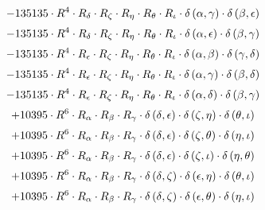 \begin{subequations}
\begin{gather}
 \\[0.2em] \notag 		 - 135135 \cdot R^{4} \cdot R_{\delta{}} \cdot R_{\zeta{}} \cdot R_{\eta{}} \cdot R_{\theta{}} \cdot R_{\iota{}} \cdot \delta{}\left(\alpha{}, \gamma{}\right) \cdot \delta{}\left(\beta{}, \epsilon{}\right) 
 \\[0.2em] \notag 		 - 135135 \cdot R^{4} \cdot R_{\delta{}} \cdot R_{\zeta{}} \cdot R_{\eta{}} \cdot R_{\theta{}} \cdot R_{\iota{}} \cdot \delta{}\left(\alpha{}, \epsilon{}\right) \cdot \delta{}\left(\beta{}, \gamma{}\right) 
 \\[0.2em] \notag 		 - 135135 \cdot R^{4} \cdot R_{\epsilon{}} \cdot R_{\zeta{}} \cdot R_{\eta{}} \cdot R_{\theta{}} \cdot R_{\iota{}} \cdot \delta{}\left(\alpha{}, \beta{}\right) \cdot \delta{}\left(\gamma{}, \delta{}\right) 
 \\[0.2em] \notag 		 - 135135 \cdot R^{4} \cdot R_{\epsilon{}} \cdot R_{\zeta{}} \cdot R_{\eta{}} \cdot R_{\theta{}} \cdot R_{\iota{}} \cdot \delta{}\left(\alpha{}, \gamma{}\right) \cdot \delta{}\left(\beta{}, \delta{}\right) 
 \\[0.2em] \notag 		 - 135135 \cdot R^{4} \cdot R_{\epsilon{}} \cdot R_{\zeta{}} \cdot R_{\eta{}} \cdot R_{\theta{}} \cdot R_{\iota{}} \cdot \delta{}\left(\alpha{}, \delta{}\right) \cdot \delta{}\left(\beta{}, \gamma{}\right) 
 \\[0.2em] \notag 		 + 10395 \cdot R^{6} \cdot R_{\alpha{}} \cdot R_{\beta{}} \cdot R_{\gamma{}} \cdot \delta{}\left(\delta{}, \epsilon{}\right) \cdot \delta{}\left(\zeta{}, \eta{}\right) \cdot \delta{}\left(\theta{}, \iota{}\right) 
 \\[0.2em] \notag 		 + 10395 \cdot R^{6} \cdot R_{\alpha{}} \cdot R_{\beta{}} \cdot R_{\gamma{}} \cdot \delta{}\left(\delta{}, \epsilon{}\right) \cdot \delta{}\left(\zeta{}, \theta{}\right) \cdot \delta{}\left(\eta{}, \iota{}\right) 
 \\[0.2em] \notag 		 + 10395 \cdot R^{6} \cdot R_{\alpha{}} \cdot R_{\beta{}} \cdot R_{\gamma{}} \cdot \delta{}\left(\delta{}, \epsilon{}\right) \cdot \delta{}\left(\zeta{}, \iota{}\right) \cdot \delta{}\left(\eta{}, \theta{}\right) 
 \\[0.2em] \notag 		 + 10395 \cdot R^{6} \cdot R_{\alpha{}} \cdot R_{\beta{}} \cdot R_{\gamma{}} \cdot \delta{}\left(\delta{}, \zeta{}\right) \cdot \delta{}\left(\epsilon{}, \eta{}\right) \cdot \delta{}\left(\theta{}, \iota{}\right) 
 \\[0.2em] \notag 		 + 10395 \cdot R^{6} \cdot R_{\alpha{}} \cdot R_{\beta{}} \cdot R_{\gamma{}} \cdot \delta{}\left(\delta{}, \zeta{}\right) \cdot \delta{}\left(\epsilon{}, \theta{}\right) \cdot \delta{}\left(\eta{}, \iota{}\right) 

\end{gather}
\end{subequations}
